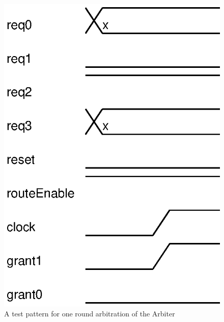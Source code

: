 \documentclass[final]{IEEEtran}
\begin{document}
\begin{figure}[tbph]
\begin{center}
\includegraphics[width=.3\textwidth]{TestPatternForOne.eps}
\end{center}
\caption{A test pattern for one round arbitration of the Arbiter}
\label{fig:TestPatternForOne}
\end{figure}
\end{document}
